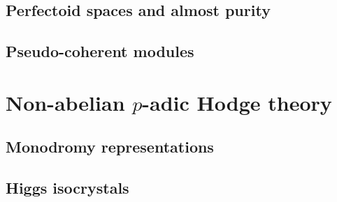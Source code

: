        \begin{appendices}
            \chapter{Perfectoid spaces and almost purity}
                \begin{abstract}
                    
                \end{abstract}
                
                \minitoc
                
                
                
                
                
                
                
            \chapter{Pseudo-coherent modules}
                \begin{abstract}
                    
                \end{abstract}
                
                \minitoc
        \end{appendices}
    
    \part{Non-abelian \texorpdfstring{$p$}{}-adic Hodge theory}
        \chapter{Monodromy representations}
            \begin{abstract}
                    
            \end{abstract}
            
            \minitoc
            
            
            
            
            
        \chapter{Higgs isocrystals}
            
            
            
	
	\printbibliography

